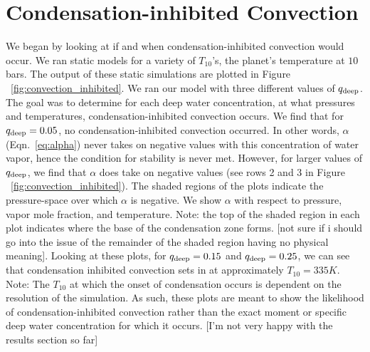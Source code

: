 \documentclass[11pt]{ucscthesisbs}
\begin{document}
\section{Condensation-inhibited Convection}
We began by looking at if and when condensation-inhibited convection would occur. We ran static models for a variety of $T_{10}$'s, the planet's temperature at $10$ bars. The output of these static simulations are plotted in Figure ~\ref{fig:convection_inhibited}. We ran our model with three different values of $q_{\rm deep}$. The goal was to determine for each deep water concentration, at what pressures and temperatures, condensation-inhibited convection occurs. We find that for $q_{\rm deep} = 0.05$, no condensation-inhibited convection occurred. In other words, $\alpha$ (Eqn.~\ref{eq:alpha})  never takes on negative values with this concentration of water vapor, hence the condition for stability is never met. However, for larger values of $q_{\rm deep}$, we find that $\alpha$ does take on negative values (see rows 2 and 3 in Figure ~\ref{fig:convection_inhibited}). The shaded regions of the plots indicate the pressure-space over which $\alpha$ is negative. We show $\alpha$ with respect to pressure, vapor mole fraction, and temperature. Note: the top of the shaded region in each plot indicates where the base of the condensation zone forms. [not sure if i should go into the issue of the remainder of the shaded region having no physical meaning]. Looking at these plots, for $q_{\rm deep} = 0.15$ and $q_{\rm deep} = 0.25$, we can see that condensation inhibited convection sets in at approximately $T_{10} = 335K$. Note: The $T_{10}$ at which the onset of condensation occurs is dependent on the resolution of the simulation. As such, these plots are meant to show the likelihood of condensation-inhibited convection rather than the exact moment or specific deep water concentration for which it occurs. [I'm not very happy with the results section so far]
\end{document}
